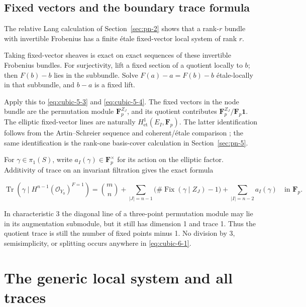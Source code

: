 \documentclass[11pt]{article}
\begin{document}
\subsection{Fixed vectors and the boundary trace formula}\label{sec:cubic-lang-trace}

The relative Lang calculation of Section~\ref{sec:pn-2} shows that a rank-\(r\) bundle with invertible Frobenius has a finite étale fixed-vector local system of rank \(r\).

Taking fixed-vector sheaves is exact on exact sequences of these invertible Frobenius bundles. For surjectivity, lift a fixed section of a quotient locally to \(b\); then \(F(b)-b\) lies in the subbundle. Solve \(F(a)-a=F(b)-b\) étale-locally in that subbundle, and \(b-a\) is a fixed lift.

Apply this to \eqref{eq:cubic-5-3} and \eqref{eq:cubic-5-4}. The fixed vectors in the node bundle are the permutation module \(\mathbf F_p^{Z_J}\), and its quotient contributes \(\mathbf F_p^{Z_J}/\mathbf F_p\mathbf1\). The elliptic fixed-vector lines are naturally \(H^1_{\mathrm{et}}(E_I,\mathbf F_p)\). The latter identification follows from the Artin--Schreier sequence and coherent/étale comparison \citep[Section~59.63, Theorem~59.22.4, and Lemma~59.63.6]{StacksAS,StacksComparison,StacksProperAS}; the same identification is the rank-one basis-cover calculation in Section~\ref{sec:pn-5}.

For \(\gamma\in\pi_1(S)\), write \(a_I(\gamma)\in\mathbf F_p^\times\) for its action on the elliptic factor. Additivity of trace on an invariant filtration gives the exact formula

\begin{equation}
\operatorname{Tr}(\gamma\mid H^{n-1}(\mathcal O_{Y_0})^{F=1})
=\binom mn+
\sum_{|J|=n-1}\bigl(\#\operatorname{Fix}(\gamma\mid Z_J)-1\bigr)
+\sum_{|I|=n-2}a_I(\gamma)
\quad\text{in }\mathbf F_p.
\label{eq:cubic-6-1}
\end{equation}

In characteristic 3 the diagonal line of a three-point permutation module may lie in its augmentation submodule, but it still has dimension 1 and trace 1. Thus the quotient trace is still the number of fixed points minus 1. No division by 3, semisimplicity, or splitting occurs anywhere in \eqref{eq:cubic-6-1}.

\section{The generic local system and all traces}\label{sec:cubic-generic}
\end{document}
